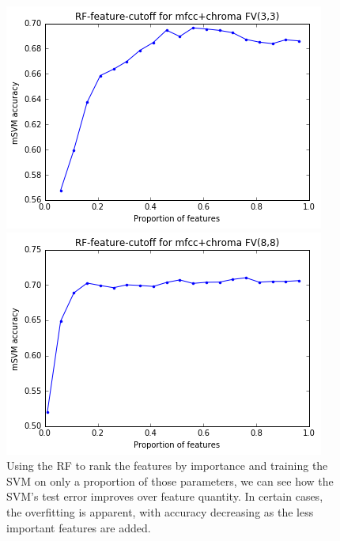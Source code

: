 \documentclass{article}
\begin{document}
\begin{figure}[H]
    \centering
    
    \begin{minipage}[b]{0.4\textwidth}
        \includegraphics[width=\textwidth]{RF-cutoff3-3.png}
    \end{minipage}
    \hfill
    \begin{minipage}[b]{0.4\textwidth}
        \includegraphics[width=\textwidth]{RF-cutoff8-8.png}
    \end{minipage}
    \label{fig:rf-cutoff}
    \caption{Using the RF to rank the features by importance and training the SVM on only a proportion of those parameters, we can see how the SVM's test error improves over feature quantity. In certain cases, the overfitting is apparent, with accuracy decreasing as the less important features are added.}
\end{figure}
\end{document}
